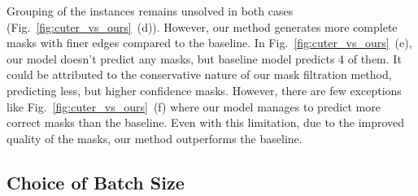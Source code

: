Grouping of the instances remains unsolved in both cases (Fig.~\ref{fig:cuter_vs_ours}~(d)). However, our method generates more complete masks with finer edges compared to the baseline. In Fig.~\ref{fig:cuter_vs_ours}~(e), our model doesn't predict any masks, but baseline model predicts 4 of them. It could be attributed to the conservative nature of our mask filtration method, predicting less, but higher confidence masks. However, there are few exceptions like Fig.~\ref{fig:cuter_vs_ours}~(f) where our model manages to predict more correct masks than the baseline. Even with this limitation, due to the improved quality of the masks, our method outperforms the baseline.
%
%

\subsection{Choice of Batch Size}
\label{section:choice_of_batch_size}

